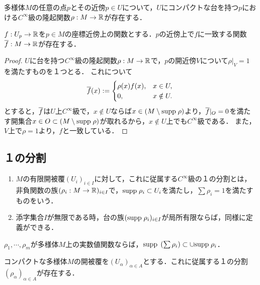 \documentclass[uplatex,dvipdfmx]{jsreport}
\begin{document}
\begin{theorem}
    多様体$M$の任意の点$p$とその近傍$p\in U$について，$U$にコンパクトな台を持つ$p$における$C^\infty$級の隆起関数$\rho:M\to\mathbb{R}$が存在する．
\end{theorem}

\begin{proposition}[関数の大域への拡張]
    $f:U_p\to\mathbb{R}$を$p\in M$の座標近傍上の関数とする．$p$の近傍上で$f$に一致する関数$\overline{f}:M\to\mathbb{R}$が存在する．
\end{proposition}
\begin{proof}
    $U$に台を持つ$C^\infty$級の隆起関数$\rho:M\to\mathbb{R}$で，$p$の開近傍$V$について$\rho|_V=1$を満たすものを１つとる．
    これについて
    \[\overline{f}(x):=\begin{cases}
        \rho(x)f(x),&x\in U,\\
        0,&x\notin U.
    \end{cases}\]
    とすると，$\overline{f}$は$U$上$C^\infty$級で，$x\notin U$ならば$x\in (M\setminus\mathrm{supp}\;\rho)$より，$\overline{f}|_{O}=0$を満たす開集合$x\in O\subset (M\setminus\mathrm{supp}\;\rho)$が取れるから，$x\notin U$上でも$C^\infty$級である．
    また，$V$上で$\rho=1$より，$f$と一致している．
\end{proof}

\subsection{１の分割}

\begin{definition}\mbox{}
    \begin{enumerate}
        \item $M$の有限開被覆$(U_i)_{i\in I}$に対して，これに従属する$C^\infty$級の１の分割とは，非負関数の族$(\rho_i:M\to\mathbb{R})_{i\in I}$で，$\mathrm{supp}\;\rho_i\subset U_i$を満たし，$\sum\rho_i=1$を満たすものをいう．
        \item 添字集合$I$が無限である時，台の族$(\mathrm{supp}\; \rho_i)_{i\in I}$が局所有限ならば，同様に定義ができる．
    \end{enumerate}
\end{definition}

\begin{lemma}
    $\rho_1,\cdots,\rho_m$が多様体$M$上の実数値関数ならば，$\mathrm{supp}\;\left(\sum\rho_i\right)\subset\cup\mathrm{supp}\;\rho_i$．
\end{lemma}

\begin{proposition}
    コンパクトな多様体$M$の開被覆を$(U_\alpha)_{\alpha\in A}$とする．これに従属する１の分割$(\rho_\alpha)_{\alpha\in A}$が存在する．
\end{proposition}
\end{document}
